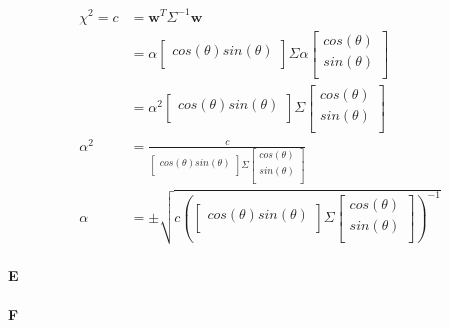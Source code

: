 \documentclass[12pt]{article}
\begin{document}
\begin{align*}
\chi^2 = c &=  \mathbf{w}^T \Sigma^{-1} \mathbf{w} \\
&=  \alpha \left[ {\begin{smallmatrix}
	cos(\theta)  sin(\theta)  \\
	 \end{smallmatrix} } \right]
 	\Sigma
 	\alpha \left[ {\begin{smallmatrix}
	cos(\theta)  \\
	sin(\theta)  \\
	 \end{smallmatrix} } \right] \\
&= \alpha^2 \left[ {\begin{smallmatrix}
	cos(\theta)  sin(\theta)  \\
	 \end{smallmatrix} } \right]
 	\Sigma
 	\left[ {\begin{smallmatrix}
	cos(\theta)  \\
	sin(\theta)  \\
	 \end{smallmatrix} } \right] \\
\alpha^2 &= \frac{c}{\left[ {\begin{smallmatrix}
	cos(\theta)  sin(\theta)  \\
	 \end{smallmatrix} } \right]
 	\Sigma
 	\left[ {\begin{smallmatrix}
	cos(\theta)  \\
	sin(\theta)  \\
	 \end{smallmatrix} } \right]} \\
\alpha &=\pm\sqrt{ c \left( \left[ {\begin{smallmatrix}
	cos(\theta)  sin(\theta)  \\
	 \end{smallmatrix} } \right]
 	\Sigma
 	\left[ {\begin{smallmatrix}
	cos(\theta)  \\
	sin(\theta)  \\
	 \end{smallmatrix} } \right]
	 \right)^{-1}}
\end{align*}


\paragraph{E}

\paragraph{F}
\end{document}

